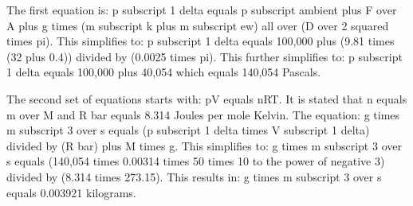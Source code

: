 The first equation is:
p subscript 1 delta equals p subscript ambient plus F over A plus g times (m subscript k plus m subscript ew) all over (D over 2 squared times pi).
This simplifies to:
p subscript 1 delta equals 100,000 plus (9.81 times (32 plus 0.4)) divided by (0.0025 times pi).
This further simplifies to:
p subscript 1 delta equals 100,000 plus 40,054 which equals 140,054 Pascals.

The second set of equations starts with:
pV equals nRT.
It is stated that n equals m over M and R bar equals 8.314 Joules per mole Kelvin.
The equation:
g times m subscript 3 over s equals (p subscript 1 delta times V subscript 1 delta) divided by (R bar) plus M times g.
This simplifies to:
g times m subscript 3 over s equals (140,054 times 0.00314 times 50 times 10 to the power of negative 3) divided by (8.314 times 273.15).
This results in:
g times m subscript 3 over s equals 0.003921 kilograms.